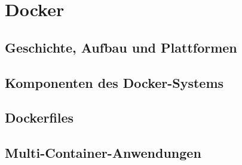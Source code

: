 \chapter{Docker}
\label{cha:docker}
\section{Geschichte, Aufbau und Plattformen}
\label{sec:docker-basics}
\section{Komponenten des Docker-Systems}
\label{sec:docker-komponenten}
\section{Dockerfiles}
\label{sec:dockerfiles}
\section{Multi-Container-Anwendungen}
\label{sec:docker-multi-container-anwendungen}
